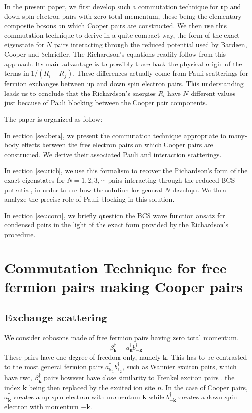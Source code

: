 \documentclass[aps,prb,superscriptaddress,showpacs,reprint,lengthcheck]{revtex4-1}
\newcommand{\vk}{\ensuremath{\mathbf{k}}}
\begin{document}
In the present paper, we first develop such a commutation technique for up and down spin
electron pairs with zero total momentum, these being the elementary composite bosons on which Cooper pairs are constructed. We then use this commutation technique to derive in a quite
compact way, the form of the exact eigenstate for $N$ pairs interacting
through the reduced potential used by Bardeen, Cooper and Schrieffer. The Richardson's equations readily follow
from this approach. Its main advantage is to possibly trace back the physical origin of the terms in $1/(R_i-R_j)$. These differences actually come
from Pauli scatterings for fermion exchanges 
between up and down spin electron pairs. This understanding leads us to conclude that 
the Richardson's energies $R_i$  have $N$ different values just because 
of Pauli blocking between the Cooper pair components.

The paper is organized as follow:

In section \ref{sec:beta}, we present the commutation technique  appropriate to many-body effects between the free
electron pairs on which Cooper pairs are constructed. We derive their associated Pauli and interaction scatterings.

In section \ref{sec:rich}, we use this formalism to recover the Richardson's form of the
exact eigenstates for $N=1,2,3,\cdots$ pairs interacting through the reduced
BCS potential, in order to see how the solution for general $N$ develops. We
then analyze the precise role of Pauli blocking in this solution.

In section \ref{sec:conn}, we briefly question the BCS wave function ansatz for condensed pairs in the light of the exact form provided by the Richardson's procedure.

\section{Commutation Technique for free fermion pairs making Cooper pairs\label{sec:beta}}

\subsection{Exchange scattering}

We consider cobosons made of free fermion pairs having zero total
momentum. 
\begin{equation}
\beta^{\dagger}_\vk=a^{\dagger}_{\mathbf{k} }b^{\dagger}_{-\mathbf{k} }
\end{equation}
These pairs have one degree of freedom
only, namely $\mathbf{k}$. This has to be  contrasted to the
most general fermion pairs $a^{\dagger}_{\mathbf{k} _1}b^{\dagger}_{\mathbf{k%
} _2}$, such as Wannier exciton pairs, which have two, $\beta^{\dagger}_\vk$ pairs however have  close similarity to Frenkel exciton pairs \cite{frenkel}, the index $\mathbf{k}$ being then replaced by the excited ion site $n$. In the case of Cooper pairs, $a^{\dagger}_{\mathbf{k} }$ creates a  up spin electron with momentum $\mathbf{k}$ while $b^{\dagger}_{\mathbf{-k} }$ creates a down spin electron with momentum $\mathbf{-k}$. 
\end{document}
